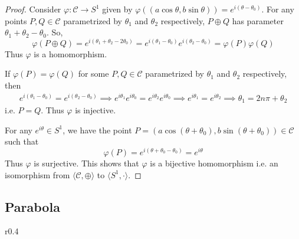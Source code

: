 \begin{proof}
    Consider $\varphi:\mathcal{C} \to S^1$ given by
    $\varphi((a\cos\theta,b\sin\theta)) = e^{i(\theta-\theta_0)}$. For any points
    $P,Q\in\mathcal{C}$ parametrized by $\theta_1$ and $\theta_2$ respectively,
    $P \oplus Q$ has parameter $\theta_1 + \theta_2 - \theta_0$. So,
    \[
        \varphi(P \oplus Q) = e^{i(\theta_1 + \theta_2 - 2\theta_0)}
        = e^{i(\theta_1 - \theta_0)}e^{i(\theta_2 - \theta_0)} = \varphi(P)\varphi(Q)
    \]
    Thus $\varphi$ is a homomorphism.
    \vspace{1ex}

    \noindent
    If $\varphi(P)=\varphi(Q)$ for some $P,Q\in\mathcal{C}$ parametrized by $\theta_1$
    and $\theta_2$ respectively, then
    \begin{align*}
        e^{i(\theta_1-\theta_0)} = e^{i(\theta_2-\theta_0)}
        \implies e^{i\theta_1}e^{i\theta_0} = e^{i\theta_2}e^{i\theta_0}
        \implies e^{i\theta_1} = e^{i\theta_2}
        \implies \theta_1 = 2n\pi + \theta_2
    \end{align*}
    i.e. $P=Q$. Thus $\varphi$ is injective.
    \vspace{1ex}

    \noindent
    For any $e^{i\theta} \in S^1$, we have the point
    $P=(a\cos(\theta+\theta_0),b\sin(\theta+\theta_0)) \in \mathcal{C}$ such that
    \[ \varphi(P) = e^{i(\theta + \theta_0 - \theta_0)} = e^{i\theta} \]
    Thus $\varphi$ is surjective. This shows that $\varphi$ is a bijective
    homomorphism i.e. an isomorphism from $\langle \mathcal{C},\oplus \rangle$ to
    $\langle S^1,\cdot \rangle$.
\end{proof}

\subsection*{Parabola}

\begin{wrapfigure}{r}{0.4\textwidth}
    \centering

    \caption{}
\end{wrapfigure}

